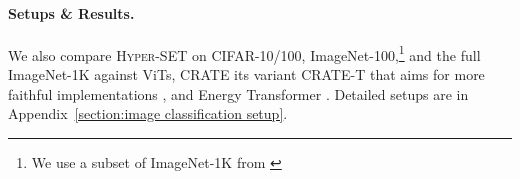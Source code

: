 \paragraph{Setups \& Results.}
We also compare \textsc{Hyper-SET} on CIFAR-10/100, ImageNet-100,\footnote{We use a subset of ImageNet-1K from \href{https://github.com/HobbitLong/CMC/blob/master/imagenet100.txt}{}} and the full ImageNet-1K against ViTs, \textsc{CRATE} \citep{yu2023white} its variant \textsc{CRATE}-T that aims for more faithful implementations \citep{hu2024an}, and Energy Transformer \citep{hoover2024energy}. Detailed setups are in Appendix~\ref{section:image classification setup}. 


